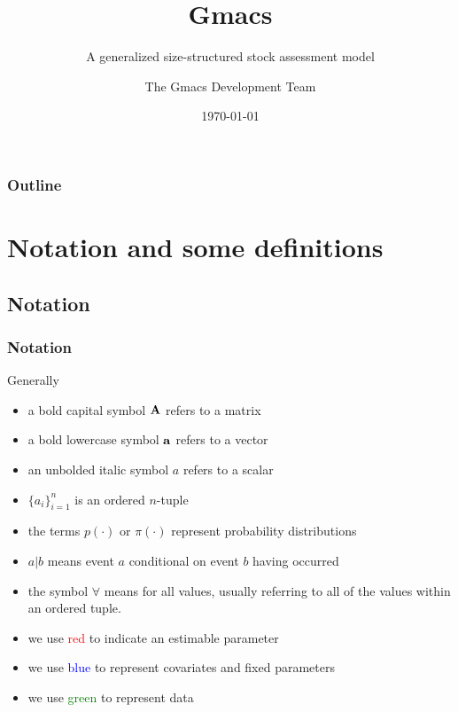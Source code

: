 \documentclass{beamer}
\title{Gmacs}
\subtitle{A generalized size-structured stock assessment model}
\author{The Gmacs Development Team}
\date{\today}
\begin{document}

\begin{frame}
\titlepage
\end{frame}


\begin{frame}
\frametitle{Outline}
\tableofcontents
\end{frame}


\section{Notation and some definitions}


\subsection{Notation}
\begin{frame}
\frametitle{Notation}
Generally
\begin{itemize}
\item a bold capital symbol ${\bf A}$ refers to a matrix
\item a bold lowercase symbol ${\bf a}$ refers to a vector
\item an unbolded italic symbol $a$ refers to a scalar
\item $\{ a_i \}^n_{i=1}$ is an ordered $n$-tuple
\item the terms $p(\cdot)$ or $\pi(\cdot)$ represent probability
  distributions
\item $a|b$ means event $a$ conditional on event $b$ having occurred
\item the symbol $\forall$ means for all values, usually referring to all of the
  values within an ordered tuple.
\item we use \textcolor{red}{red} to indicate an estimable parameter
\item we use \textcolor{blue}{blue} to represent covariates and fixed parameters
\item we use \textcolor{green}{green} to represent data
\end{itemize}
\end{frame}
\end{document}
